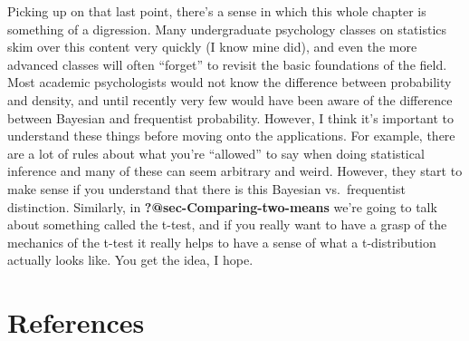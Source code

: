 \documentclass[
  letterpaper,
]{book}
\begin{document}
Picking up on that last point, there's a sense in which this whole
chapter is something of a digression. Many undergraduate psychology
classes on statistics skim over this content very quickly (I know mine
did), and even the more advanced classes will often ``forget'' to
revisit the basic foundations of the field. Most academic psychologists
would not know the difference between probability and density, and until
recently very few would have been aware of the difference between
Bayesian and frequentist probability. However, I think it's important to
understand these things before moving onto the applications. For
example, there are a lot of rules about what you're ``allowed'' to say
when doing statistical inference and many of these can seem arbitrary
and weird. However, they start to make sense if you understand that
there is this Bayesian vs.~frequentist distinction. Similarly, in
\textbf{?@sec-Comparing-two-means} we're going to talk about something
called the t-test, and if you really want to have a grasp of the
mechanics of the t-test it really helps to have a sense of what a
t-distribution actually looks like. You get the idea, I hope.


\hypertarget{references}{%
\chapter*{References}\label{references}}
\end{document}
